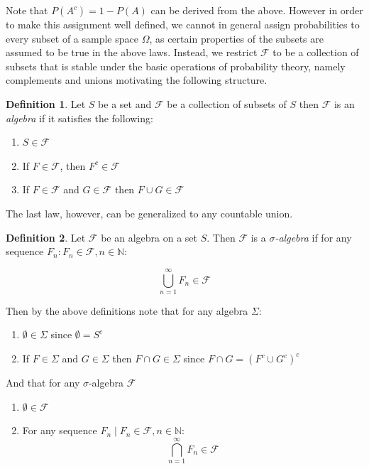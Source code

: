 \documentclass[12pt]{article}
\theoremstyle{definition}
\newtheorem{definition}{Definition}[section]
\theoremstyle{plain}
\theoremstyle{remark}
\begin{document}
Note that $P(A^c) = 1-P(A)$ can be derived from the above.  However in order to make this assignment well defined, we cannot in general assign probabilities to every subset of a sample space $\Omega$, as certain properties of the subsets are assumed to be true in the above laws.  Instead, we restrict $\mathcal{F}$ to be a collection of subsets that is stable under the basic operations of probability theory, namely complements and unions motivating the following structure.

\begin{definition}
Let $S$ be a set and $\mathcal{F}$ be a collection of subsets of $S$ then $\mathcal{F}$ is an \textit{algebra} if it satisfies the following:
\vspace{-0.25cm}
\begin{enumerate}[label=(\roman*)]
    \item $S \in \mathcal{F}$
    \item If $F \in \mathcal{F}$, then $F^c \in \mathcal{F}$
    \item If $F \in \mathcal{F}$ and $G \in \mathcal{F}$ then $F \cup G \in \mathcal{F}$
\end{enumerate}
\end{definition}

The last law, however, can be generalized to any countable union.
\begin{definition}
Let $\mathcal{F}$ be an algebra on a set $S$.  Then $\mathcal{F}$ is a \textit{$\sigma$-algebra} if for any sequence $F_n : F_n \in \mathcal{F}, n \in \mathbb{N}$:

\[
    \bigcup_{n=1}^\infty F_n \in \mathcal{F}
\]

\end{definition}

Then by the above definitions note that for any algebra $\Sigma$:
\vspace{-0.25cm}
\begin{enumerate}
    \item $\emptyset \in \Sigma$ since $\emptyset = S^c$
    \item If $F \in \Sigma$ and $G \in \Sigma$ then $F \cap G \in \Sigma$ since $F \cap G = (F^c \cup G^c)^c$ 
\end{enumerate}
And that for any $\sigma$-algebra $\mathcal{F}$
\vspace{-0.25cm}
\begin{enumerate}
    \item $\emptyset \in \mathcal{F}$
    \item For any sequence $F_n \mid F_n \in \mathcal{F}, n \in \mathbb{N}$:
    \[
           \bigcap_{n=1}^\infty F_n \in \mathcal{F}   
    \]

\end{enumerate}
\end{document}
